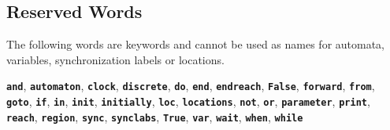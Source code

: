 \documentclass[a4paper,10pt]{article}
\newcommand{\code}[1]{\textbf{\texttt{#1}}}
\begin{document}


\subsection{Reserved Words}

The following words are keywords and cannot be used as names for automata, variables, synchronization labels or locations. 

\code{and},
\code{automaton},
\code{clock},
\code{discrete},
\code{do},
\code{end},
\code{endreach},
\code{False},
\code{forward},
\code{from},
\code{goto},
\code{if},
\code{in},
\code{init},
\code{initially},
\code{loc},
\code{locations},
\code{not},
\code{or},
\code{parameter},
\code{print},
\code{reach},
\code{region},
\code{sync},
\code{synclabs},
\code{True},
\code{var},
\code{wait},
\code{when},
\code{while}
\end{document}
